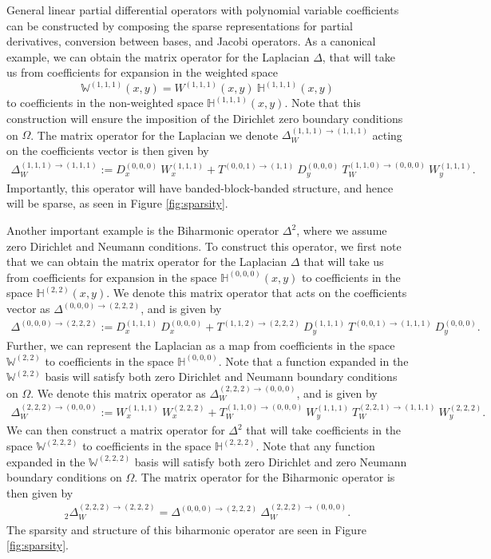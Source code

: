 \documentclass[11pt, oneside]{article}   	%
\newcommand{\hdop}{H}
\newcommand{\bighdop}{\mathbb{\hdop}}
\newcommand{\bigW}{\mathbb{W}}
\newcommand{\Wiii}{W^{(1,1,1)}}
\newcommand{\bighdopiii}{{\mathbb{\hdop}^{(1,1,1)}}}
\newcommand{\bighdopooo}{{\mathbb{\hdop}^{(0,0,0)}}}
\newcommand{\laplacewiii}{\Delta_W^{(1,1,1)\to(1,1,1)}}
\newcommand{\laplacewttt}{\Delta_W^{(2,2,2)\to(0,0,0)}}
\newcommand{\laplaceooo}{\Delta^{(0,0,0)\to(2,2,2)}}
\newcommand{\biharmonictwo}{_2\Delta_W^{(2,2,2)\to(2,2,2)}}
\newcommand{\bigWiii}{{\mathbb{W}^{(1,1,1)}}}
\begin{document}
General linear partial differential operators with polynomial variable coefficients can be constructed by composing the sparse representations for partial derivatives, conversion between bases, and Jacobi operators. As a canonical example, we can obtain the matrix operator for the Laplacian \(\Delta\), that will take us from coefficients for expansion in the weighted space
$$
\bigWiii(x,y) = \Wiii(x,y) \: \bighdopiii(x,y)
$$
to coefficients in the non-weighted space $\bighdopiii(x,y)$. Note that this construction will ensure the imposition of the Dirichlet zero boundary conditions on $\Omega$. The matrix operator for the Laplacian we denote $\laplacewiii$ acting on the coefficients vector is then given by
\begin{align*}
    \laplacewiii := D_x^{(0,0,0)} \: W_x^{(1,1,1)} + T^{(0,0,1)\to(1,1)} \: D_y^{(0,0,0)} \: T_W^{(1,1,0)\to(0,0,0)} \: W_y^{(1,1,1)}.
\end{align*}
Importantly, this operator will have banded-block-banded structure, and hence will be sparse, as seen in Figure \ref{fig:sparsity}.

Another important example is the Biharmonic operator $\Delta^2$, where we assume zero Dirichlet and Neumann conditions. To construct this operator, we first note that we can obtain the matrix operator for the Laplacian $\Delta$ that will take us from coefficients for expansion in the space $\bighdopooo(x,y)$ to coefficients in the space $\bighdop^{(2,2)}(x,y)$. We denote this matrix operator that acts on the coefficients vector as $\laplaceooo$, and is given by
\begin{align*}
    \laplaceooo := D_x^{(1,1,1)} \: D_x^{(0,0,0)} + T^{(1,1,2)\to(2,2,2)} \: D_y^{(1,1,1)} \: T^{(0,0,1)\to(1,1,1)} \: D_y^{(0,0,0)}.
\end{align*}
Further, we can represent the Laplacian as a map from coefficients in the space $\bigW^{(2,2)}$ to coefficients in the space $\bighdopooo$. Note that a function expanded in the $\bigW^{(2,2)}$ basis will satisfy both zero Dirichlet and Neumann boundary conditions on $\Omega$. We denote this matrix operator as $\laplacewttt$, and is given by
\begin{align*}
	\laplacewttt := W_x^{(1,1,1)} \: W_x^{(2,2,2)} + T_W^{(1,1,0)\to(0,0,0)} \: W_y^{(1,1,1)} \: T_W^{(2,2,1)\to(1,1,1)} \: W_y^{(2,2,2)}.
\end{align*}
We can then construct a matrix operator for $\Delta^2$ that will take coefficients in the space $\bigW^{(2,2,2)}$ to coefficients in the space $\bighdop^{(2,2,2)}$. Note that any function expanded in the $\bigW^{(2,2,2)}$ basis will satisfy both zero Dirichlet and zero Neumann boundary conditions on $\Omega$. The matrix operator for the Biharmonic operator is then given by
\begin{align*}
	\biharmonictwo = \laplaceooo \: \laplacewttt.
\end{align*}
The sparsity and structure of this biharmonic operator are seen in Figure \ref{fig:sparsity}.
\end{document}

